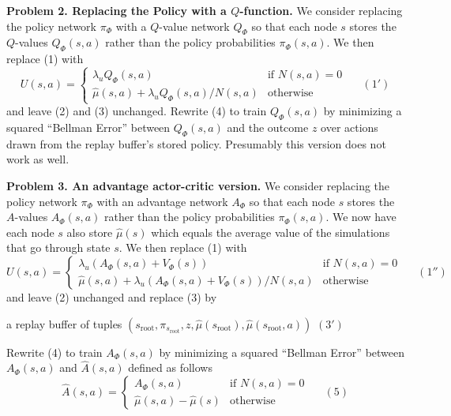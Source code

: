 \documentclass{article}
\newcommand{\solution}[1]{\bigskip {\color{red} {\bf Solution}: #1}}
\begin{document}
\bigskip
{\bf Problem 2.  Replacing the Policy with a $Q$-function.}
We consider replacing the policy network $\pi_\Phi$ with a $Q$-value network $Q_\Phi$ so that each node $s$ stores the $Q$-values $Q_\Phi(s,a)$ rather than
the policy probabilities $\pi_\Phi(s,a)$.  We then replace (1) with
$$U(s,a) =  \left\{\begin{array}{ll}\lambda_u Q_\Phi(s,a) &\mbox{if $N(s,a) = 0$} \\ \hat{\mu}(s,a) + \lambda_u Q_\Phi(s,a)/N(s,a) & \mbox{otherwise} \end{array}\right.\;\;\;\;\;(1')$$
and leave (2) and (3) unchanged.  Rewrite (4) to train $Q_\Phi(s,a)$ by minimizing a squared ``Bellman Error'' between $Q_\Phi(s,a)$ and the outcome $z$ over actions drawn from the replay buffer's stored policy.
Presumably this version does not work as well.

\solution{
  
  $$\Phi^*\; = \;\argmin_\Phi \;E_{(s,\pi,z) \sim \mathrm{Replay},\;a \sim \pi}\;
  \left(\begin{array}{l} (V_\Phi(s) - z)^2 \\ \\ - \lambda_1(Q(s,a) - z)^2 \\ \\ + \lambda_2||\Phi||^2\end{array}\right)$$
}

\bigskip
{\bf Problem 3. An advantage actor-critic version.}
We consider replacing the policy network $\pi_\Phi$ with an advantage network $A_\Phi$ so that each node $s$ stores the $A$-values $A_\Phi(s,a)$ rather than
the policy probabilities $\pi_\Phi(s,a)$.  We now have each node $s$ also store $\hat{\mu}(s)$ which equals the average value of the simulations that go through state $s$.
We then replace (1) with
$$U(s,a) =  \left\{\begin{array}{ll}\lambda_u(A_\Phi(s,a) + V_\Phi(s)) &\mbox{if $N(s,a) = 0$} \\ \hat{\mu}(s,a) + \lambda_u(A_\Phi(s,a) + V_\Phi(s))/N(s,a) & \mbox{otherwise} \end{array}\right.\;\;\;\;\;(1'')$$
and leave (2) unchanged and replace (3) by

\medskip
\centerline{a replay buffer of tuples $(s_{\mathrm{root}},\pi_{s_{\mathrm{root}}},z,\hat{\mu}(s_{\mathrm{root}}),\hat{\mu}(s_{\mathrm{root}},a))$ \hspace{2em}$(3')$}

\medskip
Rewrite (4) to train $A_\Phi(s,a)$ by minimizing a squared ``Bellman Error'' between $A_\Phi(s,a)$ and $\hat{A}(s,a)$ defined as follows
$$\hat{A}(s,a) =  \left\{\begin{array}{ll}A_\Phi(s,a) &\mbox{if $N(s,a) = 0$} \\ \hat{\mu}(s,a) - \hat{\mu}(s) & \mbox{otherwise} \end{array}\right.\;\;\;\;\;(5)$$
\end{document}
